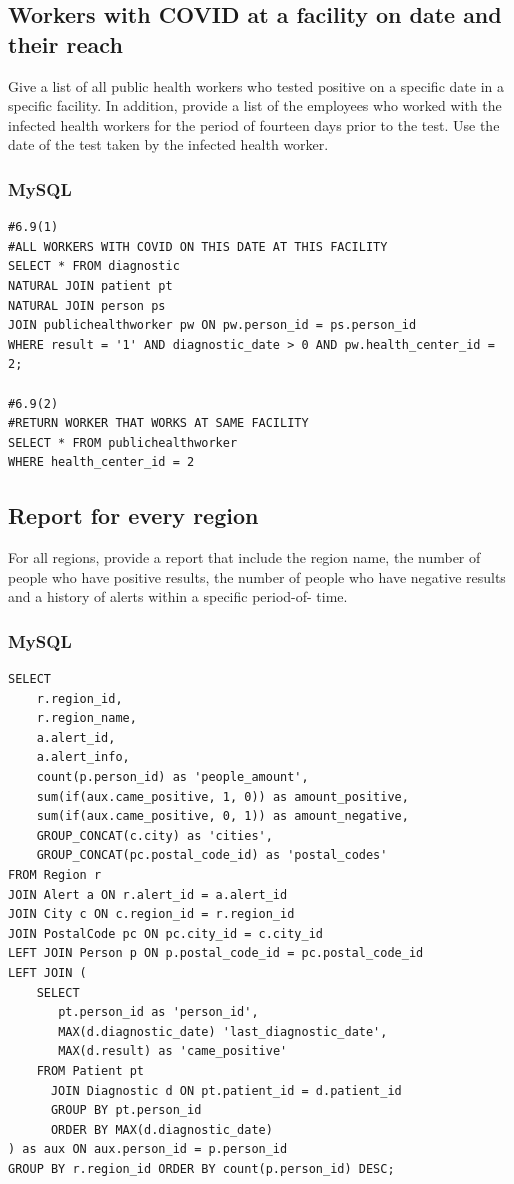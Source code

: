 \documentclass{article}
\begin{document}
\subsection{Workers with COVID at a facility on date and their reach}
Give a list of all public health workers who tested positive on a specific date
in a specific facility. In addition, provide a list of the employees who worked
with the infected health workers for the period of fourteen days prior to the
test. Use the date of the test taken by the infected health worker.

\subsubsection{MySQL}
\begin{verbatim}
#6.9(1)
#ALL WORKERS WITH COVID ON THIS DATE AT THIS FACILITY
SELECT * FROM diagnostic
NATURAL JOIN patient pt
NATURAL JOIN person ps
JOIN publichealthworker pw ON pw.person_id = ps.person_id
WHERE result = '1' AND diagnostic_date > 0 AND pw.health_center_id = 2;

#6.9(2)
#RETURN WORKER THAT WORKS AT SAME FACILITY 
SELECT * FROM publichealthworker
WHERE health_center_id = 2
\end{verbatim}

\subsection{Report for every region}
For all regions, provide a report that include the region name, the number
of people who have positive results, the number of people who have
negative results and a history of alerts within a specific period-of- time. 

\subsubsection{MySQL}
\begin{verbatim}
SELECT
    r.region_id,
    r.region_name,
    a.alert_id,
    a.alert_info,
    count(p.person_id) as 'people_amount',
    sum(if(aux.came_positive, 1, 0)) as amount_positive,
    sum(if(aux.came_positive, 0, 1)) as amount_negative,
    GROUP_CONCAT(c.city) as 'cities',
    GROUP_CONCAT(pc.postal_code_id) as 'postal_codes'
FROM Region r
JOIN Alert a ON r.alert_id = a.alert_id
JOIN City c ON c.region_id = r.region_id
JOIN PostalCode pc ON pc.city_id = c.city_id
LEFT JOIN Person p ON p.postal_code_id = pc.postal_code_id
LEFT JOIN (
    SELECT 
       pt.person_id as 'person_id',
       MAX(d.diagnostic_date) 'last_diagnostic_date',
       MAX(d.result) as 'came_positive'
    FROM Patient pt
      JOIN Diagnostic d ON pt.patient_id = d.patient_id
      GROUP BY pt.person_id
      ORDER BY MAX(d.diagnostic_date) 
) as aux ON aux.person_id = p.person_id
GROUP BY r.region_id ORDER BY count(p.person_id) DESC;
\end{verbatim}
\end{document}
